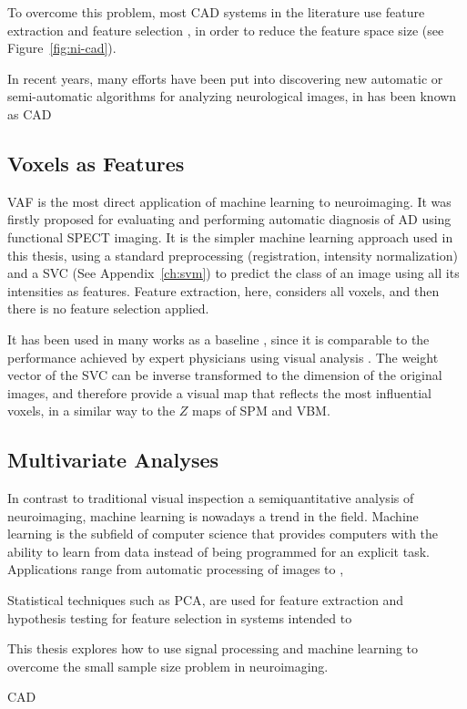 To overcome this problem, most \ac{CAD} systems in the literature use feature extraction and feature selection \cite{Martinez-Murcia2016}, in order to reduce the feature space size (see Figure~\ref{fig:ni-cad}). 


In recent years, many efforts have been put into discovering new automatic or semi-automatic algorithms for analyzing neurological images, in has been known as \acf{CAD}


\subsection{Voxels as Features}
\acf{VAF} \cite{Stoeckel04} is the most direct application of machine learning to neuroimaging. It was firstly proposed for evaluating and performing automatic diagnosis of \ac{AD} using functional \ac{SPECT} imaging. It is the simpler machine learning approach used in this thesis, using a standard preprocessing (registration, intensity normalization) and a \ac{SVC} (See Appendix~\ref{ch:svm}) to predict the class of an image using all its intensities as features. Feature extraction, here, considers all voxels, and then there is no feature selection applied. 

It has been used in many works as a baseline \cite{Salas-Gonzalez2009}, since it is comparable to the performance achieved by expert physicians using visual analysis \cite{Stoeckel04}. The weight vector of the \ac{SVC} can be inverse transformed to the dimension of the original images, and therefore provide a visual map that reflects the most influential voxels, in a similar way to the $Z$ maps of \ac{SPM} and \ac{VBM}. 

\subsection{Multivariate Analyses}
In contrast to traditional visual inspection a semiquantitative analysis of neuroimaging, machine learning is nowadays a trend in the field. Machine learning is the subfield of computer science that provides computers with the ability to learn from data instead of being programmed for an explicit task. Applications range from automatic processing of images to , 

Statistical techniques such as \ac{PCA}, are used for feature extraction and hypothesis testing for feature selection in systems intended to 

This thesis explores how to use signal processing and machine learning to overcome the small sample size problem in neuroimaging. 

\ac{CAD}


